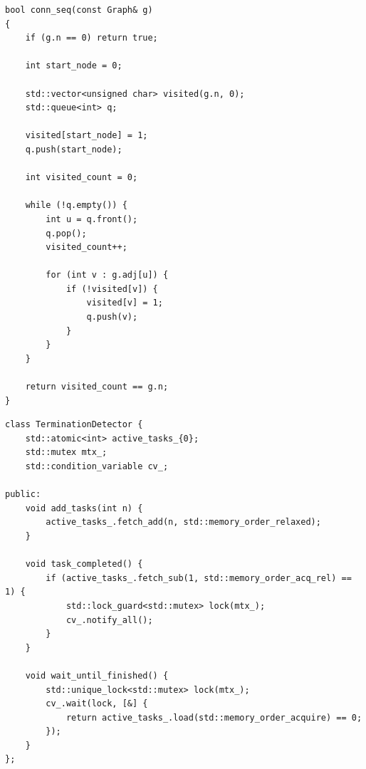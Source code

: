 \label{app:impl}

\setcounter{lstlisting}{0}
\renewcommand{\thelstlisting}{А.\arabic{lstlisting}}
\renewcommand{\thetable}{A.\arabic{table}}
\setcounter{table}{0}

\begin{lstlisting}[label={lst:conn-seq}, caption={Реализация последовательного алгоритма проверки связности (BFS)}]
bool conn_seq(const Graph& g)
{
    if (g.n == 0) return true;

    int start_node = 0;

    std::vector<unsigned char> visited(g.n, 0);
    std::queue<int> q;

    visited[start_node] = 1;
    q.push(start_node);

    int visited_count = 0;

    while (!q.empty()) {
        int u = q.front();
        q.pop();
        visited_count++;

        for (int v : g.adj[u]) {
            if (!visited[v]) {
                visited[v] = 1;
                q.push(v);
            }
        }
    }

    return visited_count == g.n;
}
\end{lstlisting}

\clearpage

\begin{lstlisting}[label={lst:termination-detector}, caption={Детектор завершения задач}]
class TerminationDetector {
    std::atomic<int> active_tasks_{0};
    std::mutex mtx_;
    std::condition_variable cv_;

public:
    void add_tasks(int n) {
        active_tasks_.fetch_add(n, std::memory_order_relaxed);
    }

    void task_completed() {
        if (active_tasks_.fetch_sub(1, std::memory_order_acq_rel) == 1) {
            std::lock_guard<std::mutex> lock(mtx_);
            cv_.notify_all();
        }
    }

    void wait_until_finished() {
        std::unique_lock<std::mutex> lock(mtx_);
        cv_.wait(lock, [&] {
            return active_tasks_.load(std::memory_order_acquire) == 0;
        });
    }
};
\end{lstlisting}

\clearpage

